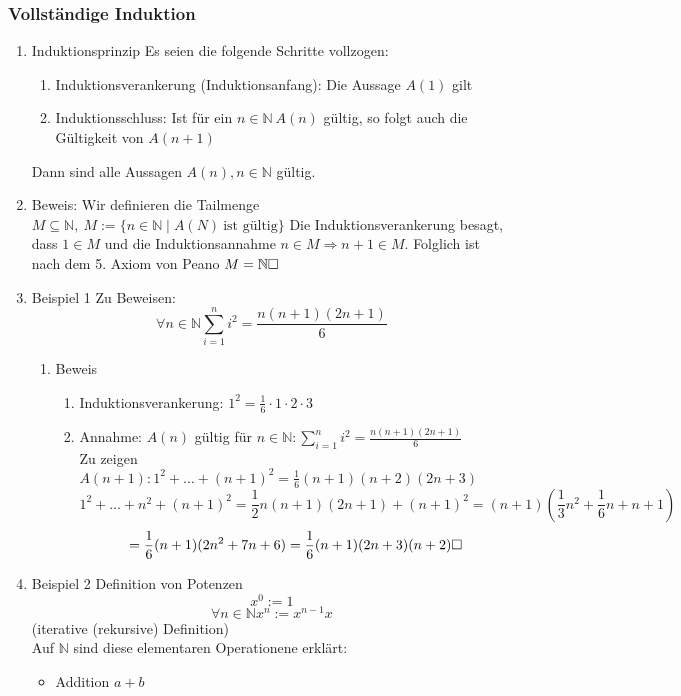 \documentclass[11pt]{article}
\DeclareMathOperator{\Forall}{\forall}%
\begin{document}
\subsubsection{Vollständige Induktion}
\label{sec-2-4-2}
\begin{enumerate}
\item Induktionsprinzip
\label{sec-2-4-2-1}
Es seien die folgende Schritte vollzogen:
\begin{enumerate}
\item Induktionsverankerung (Induktionsanfang): Die Aussage $A(1)$ gilt
\item Induktionsschluss: Ist für ein $n\in\mathbb{N}~A(n)$ gültig, so folgt auch die Gültigkeit von $A(n+1)$
\end{enumerate}
Dann sind alle Aussagen $A(n),n\in\mathbb{N}$ gültig.
\item Beweis:
\label{sec-2-4-2-2}
Wir definieren die Tailmenge $M\subseteq\mathbb{N},~M:=\{n\in \mathbb{N}\mid A(N)~\text{ist gültig}\}$
Die Induktionsverankerung besagt, dass $1\in M$ und die Induktionsannahme $n\in M\Rightarrow n + 1 \in M$. Folglich ist nach dem 5. Axiom von Peano $M = \mathbb{N}\hfill\square$
\item Beispiel 1
\label{sec-2-4-2-3}
Zu Beweisen: \[\Forall n\in\mathbb{N} \sum_{i = 1}^n i^2 = \frac{n(n+1)(2n+1)}{6}\]
\begin{enumerate}
\item Beweis
\label{sec-2-4-2-3-1}
\begin{enumerate}
\item Induktionsverankerung: $1^2 = \frac{1}{6}\cdot 1\cdot 2\cdot 3$
\item Annahme: $A(n)$ gültig für $n\in\mathbb{N}: \sum_{i = 1}^n i^2 = \frac{n(n+1)(2n+1)}{6}$ \\
         Zu zeigen $A(n + 1): 1^2 + \ldots + (n+1)^2 = \frac{1}{6} (n+1)(n+2)(2n+3)$
         \[1^2 + \ldots + n^2 + (n+1)^2 = \frac{1}{2} n(n+1)(2n+1) + (n+1)^2 = (n+1)(\frac{1}{3}n^2 + \frac{1}{6}n + n + 1)\]
         \[= \frac{1}{6}(n+1)(2n^2+7n+6) = \frac{1}{6}(n+1)(2n+3)(n+2)\hfill\square\]
\end{enumerate}
\end{enumerate}
\item Beispiel 2
\label{sec-2-4-2-4}
Definition von Potenzen
\[x^0 := 1\]
\[\Forall n\in\mathbb{N} x^n := x^{n - 1}x\]
(iterative (rekursive) Definition) \\
     Auf $\mathbb{N}$ sind diese elementaren Operationene erklärt:
\begin{itemize}
\item Addition $a+b$

\end{itemize}
\end{enumerate}
\end{document}
